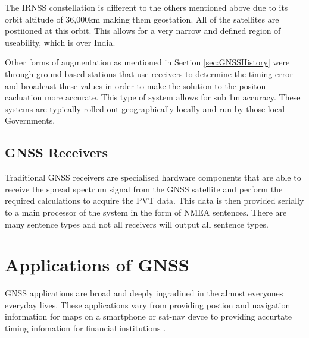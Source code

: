 The IRNSS constellation is different to the others mentioned above due to its orbit altitude of 36,000km making them geostation. All of the satellites are postiioned at
this orbit. This allows for a very narrow and defined region of useability, which is over India. 

Other forms of augmentation as mentioned in Section \ref{sec:GNSSHistory} were through ground based stations that use receivers to determine the timing error and broadcast these
values in order to make the solution to the positon cacluation more accurate. This type of system allows for sub 1m accuracy. These systems are typically rolled out
geographically locally and run by those local Governments.

\subsection{GNSS Receivers}
Traditional GNSS receivers are specialised hardware components that are able to receive the spread spectrum signal from the GNSS satellite and perform the required
calculations to acquire the PVT data. This data is then provided serially to a main processor of the system in the form of NMEA sentences. There are many sentence types
and not all receivers will output all sentence types. 


\section{Applications of GNSS} \label{sec:ApplicationsGNSS}
GNSS applications are broad and deeply ingradined in the almost everyones everyday lives. These applications vary from providing postion and navigation information for
maps on a smartphone or sat-nav devce to providing accurtate timing infomation for financial institutions \cite{RN33}.


